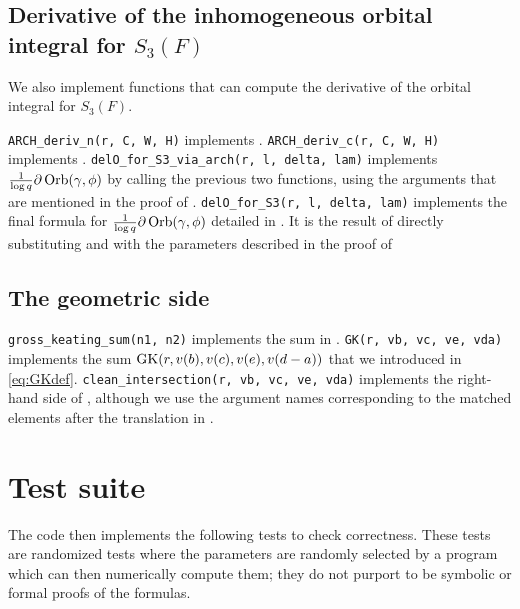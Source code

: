 \subsection{Derivative of the inhomogeneous orbital integral for $S_3(F)$}
We also implement functions that can compute the
derivative of the orbital integral for $S_3(F)$.

\begin{itemize}
  \ii \texttt{ARCH\_deriv\_n(r, C, W, H)} implements .
  \ii \texttt{ARCH\_deriv\_c(r, C, W, H)} implements .
  \ii \texttt{delO\_for\_S3\_via\_arch(r, l, delta, lam)} implements
  $\frac{1}{\log q}\partial\operatorname{Orb}(\gamma, \phi)$
  by calling the previous two functions,
  using the arguments that are mentioned in the proof of .
  \ii \texttt{delO\_for\_S3(r, l, delta, lam)} implements the final formula for
  $\frac{1}{\log q}\partial\operatorname{Orb}(\gamma, \phi)$
  detailed in .
  It is the result of directly substituting  and 
  with the parameters described in the proof of 
\end{itemize}

\subsection{The geometric side}
\begin{itemize}
  \ii \texttt{gross\_keating\_sum(n1, n2)} implements the sum in .
  \ii \texttt{GK(r, vb, vc, ve, vda)} implements the sum $\operatorname{GK}(r, v(b), v(c), v(e), v(d-a))$
  that we introduced in \eqref{eq:GKdef}.
  \ii \texttt{clean\_intersection(r, vb, vc, ve, vda)} implements the
  right-hand side of ,
  although we use the argument names corresponding to the matched elements
  after the translation in .
\end{itemize}

\section{Test suite}
The code then implements the following tests to check correctness.
These tests are randomized tests where the parameters are randomly selected by a program
which can then numerically compute them;
they do not purport to be symbolic or formal proofs of the formulas.


